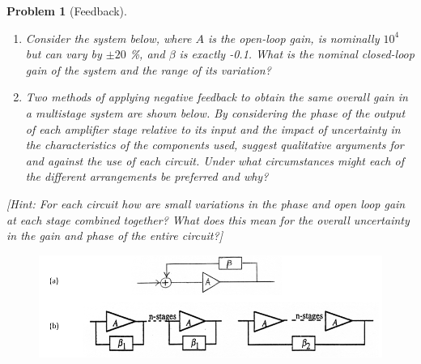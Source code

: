 \documentclass[a4paper]{article}
\theoremstyle{new}
\newtheorem{qns}{Problem}[section]
\begin{document}
\begin{qns}[Feedback]\leavevmode
\begin{enumerate}[label=(\alph*)]
\item Consider the system below, where $A$ is the open-loop gain, is nominally $10^4$ but can vary by $\pm 20$ \%, and $\beta$ is exactly -0.1. What is the nominal closed-loop gain of the system and the range of its variation?
\item Two methods of applying negative feedback to obtain the same overall gain in a multistage system are shown below. By considering the phase of the output of each amplifier stage relative to its input and the impact of uncertainty in the characteristics of the components used, suggest qualitative arguments for and against the use of each circuit. Under what circumstances might each of the different arrangements be preferred and why?
\end{enumerate}
[Hint: For each circuit how are small variations in the phase and open loop gain at each stage combined together? What does this mean for the overall uncertainty in the gain and phase of the entire circuit?]
\end{qns}
\begin{figure}[H]
    \centering
    \includegraphics[scale=0.5]{1_4.PNG}
\end{figure}
\end{document}

